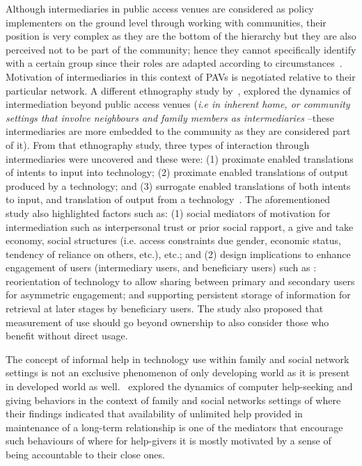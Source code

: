 Although intermediaries in public access venues are considered as policy implementers on the ground level through working with communities, their position is very complex as they are the bottom of the hierarchy but they are also perceived not to be part of the community; hence they cannot specifically identify with a certain group since their roles are adapted according to circumstances~\citep{bailur2010liminal}. Motivation of intermediaries in this context of PAVs is negotiated relative to their particular network. A different ethnography study by~\cite{sambasivan2010}, explored the dynamics of intermediation beyond public access venues (\emph{i.e in inherent home, or community settings that involve neighbours and family members as intermediaries} --these intermediaries are more embedded to the community as they are considered part of it). From that ethnography study, three types of interaction through intermediaries were uncovered and these were: (1) proximate enabled  translations of intents to input into technology; (2) proximate enabled translations of output produced by a technology; and (3) surrogate enabled translations of both intents to input, and translation of output from a technology~\citep{sambasivan2010}. The aforementioned study also highlighted factors such as: (1) social mediators of motivation for intermediation such as interpersonal trust or prior social rapport, a give and take economy, social structures (i.e. access constraints due gender, economic status, tendency of reliance on others, etc.), etc.; and (2) design implications to enhance engagement of users (intermediary users, and beneficiary users) such as : reorientation of technology  to allow sharing between primary and secondary users for asymmetric engagement; and supporting persistent storage of information for retrieval at later stages by beneficiary users. The study also proposed that measurement of use should go beyond ownership to also consider those who benefit without direct usage. 

The concept of informal help in technology use within family and social network settings is not an exclusive phenomenon of only developing world as it is present in developed world as well.~\cite{poole:chh} explored the dynamics of computer help-seeking and giving behaviors in the context of family and social networks settings of where their findings indicated that availability of unlimited help provided in maintenance of a long-term relationship is one of the mediators that encourage such behaviours of where for help-givers it is mostly motivated by a sense of being accountable to their close ones.

